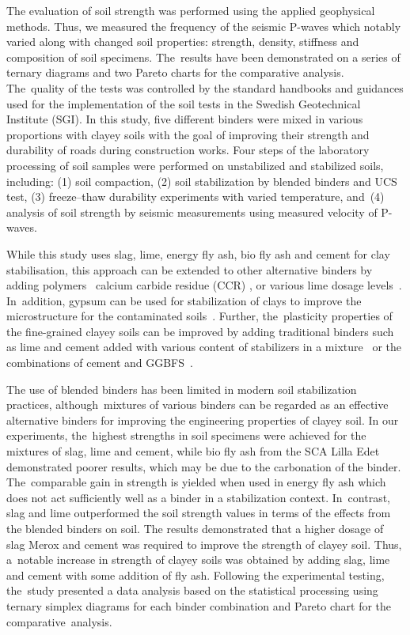 \documentclass[constrmater,article,accept,pdftex,moreauthors]{Definitions/mdpi}
\begin{document}
The {evaluation of soil strength} was performed {using} the applied geophysical methods. Thus, we measured the frequency of the seismic P-waves which notably varied along with changed soil properties: strength, density, stiffness and composition of soil specimens. The~results have been demonstrated on a series of ternary diagrams and two Pareto charts for the comparative analysis. The~quality of the tests was controlled by the standard handbooks and guidances used for the implementation of the soil tests in the Swedish Geotechnical Institute (SGI). {In this study, five different binders were mixed in various proportions with clayey soils with the goal of improving their strength and durability of roads during construction works. Four steps of the laboratory processing of soil samples were performed on unstabilized and stabilized soils, including: (1) soil compaction, (2) soil stabilization by blended binders and UCS test, (3) freeze--thaw durability experiments with varied temperature, and~(4)  analysis of soil strength by seismic measurements using measured velocity of P-waves.}

While {this study uses slag, lime, energy fly ash, bio fly ash and cement} for clay stabilisation, {this} approach can be extended to{ }other alternative binders by adding polymers~\cite{Rezaeimalek} calcium carbide residue (CCR) \cite{Horpibulsuk}, or{ }various lime dosage levels~\cite{Pedarla}. In~addition, gypsum can be used for stabilization of clays to improve the microstructure{ }for the contaminated soils~\cite{Latifi}. Further, the~plasticity properties of the fine-grained clayey soils can be improved by adding traditional binders such as lime and cement{ }added with various content of stabilizers in a mixture~\cite{Mutaz,Rogers} or the combinations of cement and GGBFS~\cite{Andersson}.

{The use of blended binders has been limited in modern soil stabilization practices, although~mixtures of various binders can be regarded as an effective alternative  binders for improving the engineering properties of clayey soil. }In our experiments, the~highest strengths in soil specimens were achieved for the mixtures of slag, lime and cement, while bio fly ash from the SCA Lilla Edet demonstrated poorer results, which may be due to the carbonation of the binder. The~comparable gain in strength is yielded when used in energy fly ash which does not act sufficiently well as a binder in a stabilization context. In~contrast, slag and lime outperformed the soil strength values in terms of the effects from the blended binders on soil. {The results demonstrated that a higher dosage of slag Merox and cement was required to improve the strength of clayey soil. }Thus, a~notable increase in strength of clayey soils was obtained by adding slag, lime and cement with some addition of fly ash. Following the experimental testing, the~study presented a data analysis based on the statistical processing using ternary simplex diagrams for each binder combination and Pareto chart for the comparative~analysis. 
\end{document}
